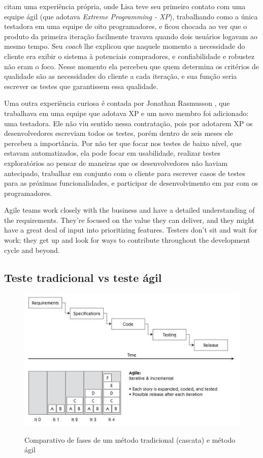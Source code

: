 \documentclass[
	12pt,				%
	openright,			%
	oneside,			%
	a4paper,			%
	english,			%
	brazil,				%
	]{abntex2}
\begin{document}
 citam uma experiência própria, onde Lisa teve seu primeiro contato com uma equipe ágil (que adotava \emph{Extreme Programming - XP}), trabalhando como a única testadora em uma equipe de oito programadores, e ficou chocada ao ver que o produto da primeira iteração facilmente travava quando dois usuários logavam ao mesmo tempo. Seu \emph{coach} lhe explicou que naquele momento a necessidade do cliente era exibir o sistema à potenciais compradores, e confiabilidade e robustez não eram o foco. Nesse momento ela percebeu que quem determina os critérios de qualidade são as necessidades do cliente a cada iteração, e sua função seria escrever os testes que garantissem essa qualidade.

Uma outra experiência curiosa é contada por Jonathan Rasmusson \cite{crispin2009}, que trabalhava em uma equipe que adotava XP e um novo membro foi adicionado: uma testadora. Ele não viu sentido nessa contratação, pois por adotarem XP os desenvolvedores escreviam todos os testes, porém dentro de seis meses ele percebeu a importância. Por não ter que focar nos testes de baixo nível, que estavam automatizados, ela pode focar em usabilidade, realizar testes exploratórios ao pensar de maneiras que os desenvolvedores não haviam antecipado, trabalhar em conjunto com o cliente para escrever casos de testes para as próximas funcionalidades, e participar de desenvolvimento em par com os programadores.

Agile teams work closely with the business and have a detailed understanding of the requirements. They’re focused on the value they can deliver, and they might have a great deal of input into prioritizing features. Testers don’t sit and wait for work; they get up and look for ways to contribute throughout the development cycle and beyond.

\subsection{Teste tradicional vs teste ágil}

\begin{figure}[H]
    \centering
    \caption{Comparativo de fases de um método tradicional (cascata) e método ágil}
    \graphicspath{ {./graphics/agile/} }
    \includegraphics[scale=1.0]{waterfall-vs-agile}
    \label{fig:waterfall-vs-agile}
\end{figure}
\end{document}
